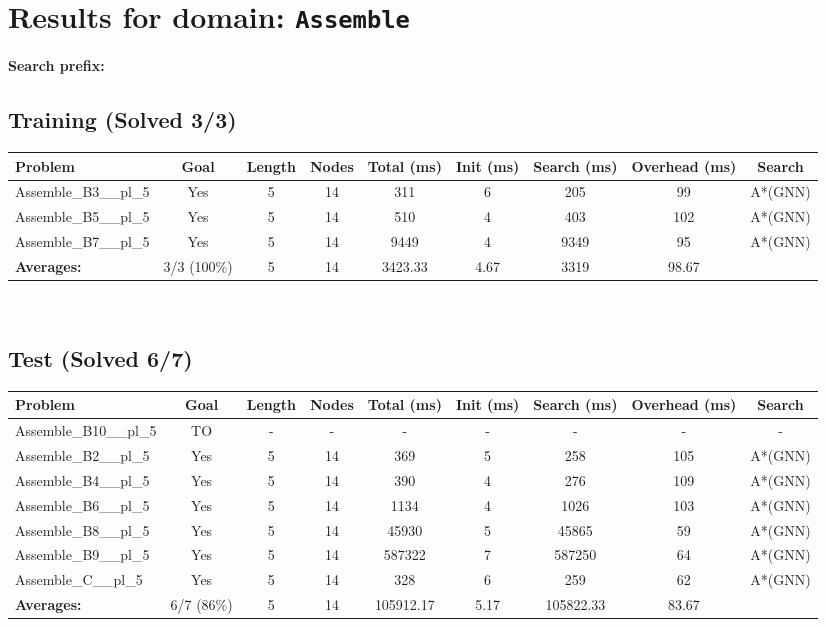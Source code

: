 \documentclass{article}
\begin{document}
\section*{Results for domain: \texttt{Assemble}}
\textbf{Search prefix:} 
\\[0.5cm]
\subsection*{Training (Solved 3/3)}
\begin{tabular}{lcccccccc}
\toprule
Problem & Goal & Length & Nodes & Total (ms) & Init (ms) & Search (ms) & Overhead (ms) & Search \\
\midrule
Assemble\_B3\_\_pl\_5 & Yes & 5 & 14 & 311 & 6 & 205 & 99 & A*(GNN) \\
Assemble\_B5\_\_pl\_5 & Yes & 5 & 14 & 510 & 4 & 403 & 102 & A*(GNN) \\
Assemble\_B7\_\_pl\_5 & Yes & 5 & 14 & 9449 & 4 & 9349 & 95 & A*(GNN) \\
\textbf{Averages:} & 3/3 (100\%) & 5 & 14 & 3423.33 & 4.67 & 3319 & 98.67 & \\
\bottomrule
\end{tabular}
\\[0.7cm]
\subsection*{Test (Solved 6/7)}
\begin{tabular}{lcccccccc}
\toprule
Problem & Goal & Length & Nodes & Total (ms) & Init (ms) & Search (ms) & Overhead (ms) & Search \\
\midrule
Assemble\_B10\_\_pl\_5 & TO & - & - & - & - & - & - & - \\
Assemble\_B2\_\_pl\_5 & Yes & 5 & 14 & 369 & 5 & 258 & 105 & A*(GNN) \\
Assemble\_B4\_\_pl\_5 & Yes & 5 & 14 & 390 & 4 & 276 & 109 & A*(GNN) \\
Assemble\_B6\_\_pl\_5 & Yes & 5 & 14 & 1134 & 4 & 1026 & 103 & A*(GNN) \\
Assemble\_B8\_\_pl\_5 & Yes & 5 & 14 & 45930 & 5 & 45865 & 59 & A*(GNN) \\
Assemble\_B9\_\_pl\_5 & Yes & 5 & 14 & 587322 & 7 & 587250 & 64 & A*(GNN) \\
Assemble\_C\_\_pl\_5 & Yes & 5 & 14 & 328 & 6 & 259 & 62 & A*(GNN) \\
\textbf{Averages:} & 6/7 (86\%) & 5 & 14 & 105912.17 & 5.17 & 105822.33 & 83.67 & \\
\bottomrule
\end{tabular}
\\[0.7cm]
\end{document}

